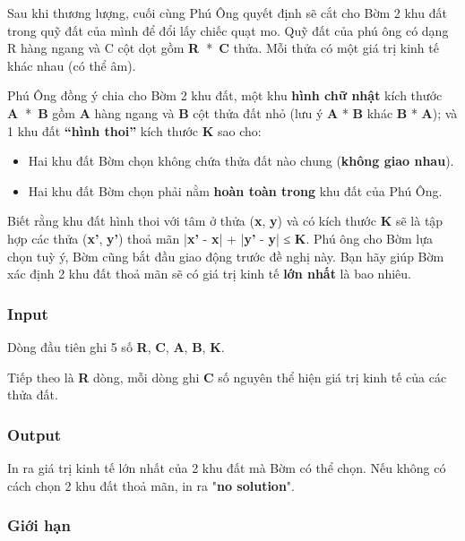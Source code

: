 

Sau khi thương lượng, cuối cùng Phú Ông quyết định sẽ cắt cho Bờm 2 khu đất trong quỹ đất của mình để đổi lấy chiếc quạt mo. Quỹ đất của phú ông có dạng R hàng ngang và C cột dọt gồm \textbf{R }* \textbf{C} thửa. Mỗi thửa có một giá trị kinh tế khác nhau (có thể âm).

Phú Ông đồng ý chia cho Bờm 2 khu đất, một khu \textbf{hình chữ nhật} kích thước \textbf{A }* \textbf{B} gồm \textbf{A} hàng ngang và \textbf{B }cột thửa đất nhỏ (lưu ý \textbf{A} * \textbf{B} khác \textbf{B} * \textbf{A}); và 1 khu đất \textbf{“hình thoi”} kích thước \textbf{K} sao cho:
\begin{itemize}
	\item Hai khu đất Bờm chọn không chứa thửa đất nào chung (\textbf{không giao nhau}).
	\item Hai khu đất Bờm chọn phải nằm \textbf{hoàn toàn trong} khu đất của Phú Ông.
\end{itemize}

Biết rằng khu đất hình thoi với tâm ở thửa (\textbf{x}, \textbf{y}) và có kích thước \textbf{K} sẽ là tập hợp các thửa (\textbf{x'}, \textbf{y'}) thoả mãn |\textbf{x’} - \textbf{x}| + |\textbf{y’} - \textbf{y}| ≤ \textbf{K}. Phú ông cho Bờm lựa chọn tuỳ ý, Bờm cũng bắt đầu giao động trước đề nghị này. Bạn hãy giúp Bờm xác định 2 khu đất thoả mãn sẽ có giá trị kinh tế \textbf{lớn nhất} là bao nhiêu.

\subsubsection{Input}

Dòng đầu tiên ghi 5 số \textbf{R}, \textbf{C}, \textbf{A}, \textbf{B}, \textbf{K}.

Tiếp theo là \textbf{R} dòng, mỗi dòng ghi \textbf{C} số nguyên thể hiện giá trị kinh tế của các thửa đất.

\subsubsection{Output}

In ra giá trị kinh tế lớn nhất của 2 khu đất mà Bờm có thể chọn. Nếu không có cách chọn 2 khu đất thoả mãn, in ra "\textbf{no solution}".

\subsubsection{Giới hạn}

